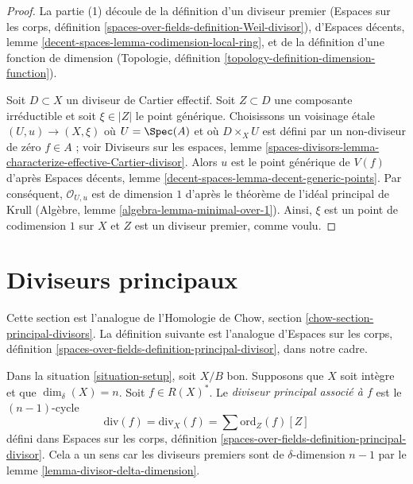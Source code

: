 \begin{proof}
La partie (1) découle de la définition d'un diviseur premier (Espaces sur les
corps, définition \ref{spaces-over-fields-definition-Weil-divisor}), d'Espaces
décents, lemme \ref{decent-spaces-lemma-codimension-local-ring}, et de la
définition d'une fonction de dimension (Topologie, définition
\ref{topology-definition-dimension-function}).

\medskip\noindent
Soit $D \subset X$ un diviseur de Cartier effectif. Soit $Z \subset D$
une composante irréductible et soit $\xi \in |Z|$ le point générique.
Choisissons un voisinage \'etale $(U, u) \to (X, \xi)$ où $U = \Spec(A)$ et où
$D \times_X U$ est défini par un non-diviseur de zéro $f \in A$ ; voir
Diviseurs sur les espaces, lemme
\ref{spaces-divisors-lemma-characterize-effective-Cartier-divisor}. Alors $u$
est le point générique de $V(f)$ d'après Espaces décents, lemme
\ref{decent-spaces-lemma-decent-generic-points}. Par conséquent,
$\mathcal{O}_{U, u}$ est de dimension $1$ d'après le théorème de l'idéal
principal de Krull (Algèbre, lemme \ref{algebra-lemma-minimal-over-1}). Ainsi,
$\xi$ est un point de codimension $1$ sur $X$ et $Z$ est un diviseur premier,
comme voulu.
\end{proof}












\section{Diviseurs principaux}
\label{section-principal-divisors}

\noindent
Cette section est l'analogue de l'Homologie de Chow, section
\ref{chow-section-principal-divisors}. La définition suivante est l'analogue
d'Espaces sur les corps, définition
\ref{spaces-over-fields-definition-principal-divisor}, dans notre cadre.

\begin{definition}
\label{definition-principal-divisor}
Dans la situation \ref{situation-setup}, soit $X/B$ bon. Supposons que
$X$ soit intègre et que $\dim_\delta(X) = n$. Soit $f \in R(X)^*$. Le
{\it diviseur principal associé à $f$} est le $(n - 1)$-cycle
$$
\text{div}(f) = \text{div}_X(f) = \sum \text{ord}_Z(f) [Z]
$$
défini dans Espaces sur les corps, définition
\ref{spaces-over-fields-definition-principal-divisor}. Cela a un sens car
les diviseurs premiers sont de $\delta$-dimension $n - 1$ par le lemme
\ref{lemma-divisor-delta-dimension}.
\end{definition}

